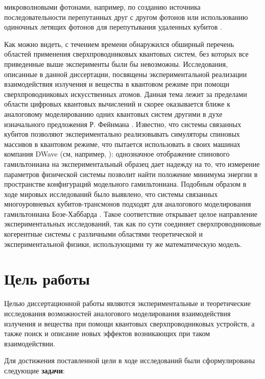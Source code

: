 \documentclass[14pt, a4paper]{extreport}
\numberwithin{equation}{section}
\begin{document}
микроволновыми фотонами, например, по созданию источника последовательности перепутанных друг с другом фотонов \cite{besse2020realizing} или использованию одиночных летящих фотонов для перепутывания удаленных кубитов \cite{kurpiers2018deterministic}.

Как можно видеть, с течением времени обнаружился обширный перечень областей применения сверхпроводниковых квантовых систем, без которых все приведенные выше эксперименты были бы невозможны. Исследования, описанные в данной диссертации, посвящены экспериментальной реализации взаимодействия излучения и вещества в квантовом режиме при помощи сверхпроводниковых искусственных атомов. Данная тема лежит за пределами области цифровых квантовых вычислений и скорее оказывается ближе к аналоговому моделированию одних квантовых систем другими в духе изначального предложения Р. Фейнмана \cite{feynman1982simulating}. Известно, что системы связанных кубитов позволяют экспериментально реализовывать симуляторы спиновых массивов в квантовом режиме, что пытается использовать в своих машинах компания DWave (см, например, \cite{harris2018phase}): однозначное отображение спинового гамильтониана на экспериментальный образец дает надежду на то, что измерение параметров физической системы позволит найти положение минимума энергии в пространстве конфигураций модельного гамильтониана. Подобным образом в ходе мировых исследований было выявлено, что системы связанных многоуровневых кубитов\hyp трансмонов подходят для аналогового моделирования гамильтониана Бозе-Хаббарда \cite{Orell2019, Ma2019, Hacohen-Gourgy2015, Deng2016, Ye2019, Yan2019}. Такое соответствие открывает целое направление экспериментальных исследований, так как по сути соединяет сверхпроводниковые когерентные системы с различными областями теоретической и экспериментальной физики, использующими ту же математическую модель.

\section*{Цель работы}

Целью диссертационной работы являются экспериментальные и теоретические исследования возможностей аналогового моделирования взаимодействия излучения и вещества при помощи квантовых сверхпроводниковых устройств, а также поиск и описание новых эффектов возникающих при таком взаимодействии.

Для достижения поставленной цели в ходе исследований были сформулированы следующие \textbf{задачи}:
\end{document}
